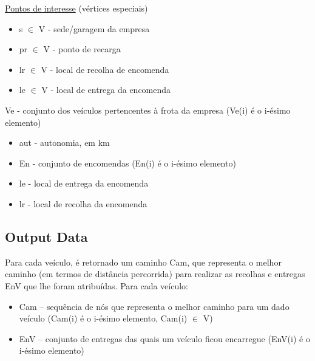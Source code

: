\documentclass[12pt]{article}
\begin{document}
\uline{Pontos de interesse} (vértices especiais)
\begin{itemize}
	\item s $ \in $  V - sede/garagem da empresa
	\item pr $ \in $  V - ponto de recarga
	\item lr $ \in $  V - local de recolha de encomenda
	\item le $ \in $  V - local de entrega da encomenda
\end{itemize}

Ve - conjunto dos veículos pertencentes à frota da empresa (Ve(i) é o i-ésimo elemento)
\begin{itemize}
	\item aut - autonomia, em km
    \item En - conjunto de encomendas (En(i) é o i-ésimo elemento)
	\item le - local de entrega da encomenda
	\item lr - local de recolha da encomenda
\end{itemize}

\subsection{Output Data}
Para cada veículo, é retornado um caminho Cam, que representa o melhor caminho (em termos de distância percorrida) para realizar as recolhas e entregas EnV que lhe foram atribuídas.
Para cada veículo:
\begin{itemize}
	\item Cam – sequência de nós que representa o melhor caminho para um dado veículo (Cam(i) é o i-ésimo elemento, Cam(i) $ \in $  V)
	\item EnV – conjunto de entregas das quais um veículo ficou encarregue (EnV(i) é o i-ésimo elemento)
\end{itemize}
\end{document}
